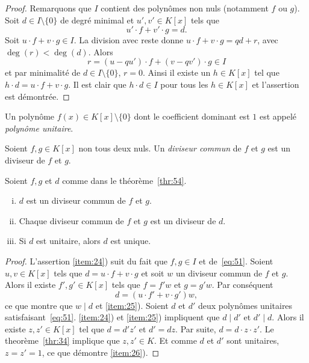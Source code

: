 \begin{proof}
  Remarquons que $I$ contient des polynômes non nuls (notamment $f$ ou $g$). Soit $d ∈ I \setminus \{0\}$ de degré minimal et $u',v' ∈ K[x]$ tels que
  \begin{displaymath}
    u' ⋅ f + v' ⋅g = d. 
  \end{displaymath}
  Soit $u⋅f + v⋅ g ∈ I$. La division avec reste donne $u⋅f + v⋅ g = qd +r$, avec $\deg(r) < \deg(d)$. Alors
  \begin{displaymath}
    r = (u - qu') ⋅ f + (v - qv') ⋅ g ∈ I
  \end{displaymath}
  et par minimalité de $d ∈ I \setminus\{0\}$, $r=0$. Ainsi il existe un $h∈K[x]$ tel que $h⋅d =  u⋅f + v⋅ g$. Il est clair que $h⋅d ∈I$ pour tous les $h ∈K[x]$ et l'assertion est démontrée.   
\end{proof}


\begin{definition}
  \label{def:54}
  Un polynôme $f(x) ∈ K[x] \setminus \{0\}$  dont le coefficient dominant est $1$ est appelé \emph{polynôme unitaire}. 
\end{definition}


\begin{definition}
  \label{def:55}
  Soient $f,g ∈ K[x]$ non tous deux nuls. Un \emph{diviseur commun} de $f$ et $g$  est un diviseur de $f$ et $g$. 
\end{definition}

\begin{theorem}
  \label{thr:55}
  Soient $f, g$ et $d$  comme dans le  théorème~\ref{thr:54}.
  \begin{enumerate}[i)]
  \item $d$ est un diviseur commun de $f$ et $g$. \label{item:24}
  \item Chaque diviseur commun de $f$ et $g$ est un diviseur de $d$. \label{item:25}
  \item Si $d$ est unitaire, alors $d$ est unique.  \label{item:26}
  \end{enumerate}
\end{theorem}

\begin{proof}
  L'assertion \ref{item:24}) suit du fait que $f,g ∈ I$ et de~\eqref{eq:51}. Soient $u,v ∈K[x]$  tels que
  $    d = u⋅f  + v ⋅ g $
  et soit $w$ un diviseur commun de $f$ et $g$. Alors il existe $f',g' ∈K[x]$ tels que  $f = f' w$ et $g = g' w$. Par conséquent
  \begin{displaymath}
    d = (u⋅f'  + v ⋅ g') w,
  \end{displaymath}
  ce que montre que $w \mid d$ et \ref{item:25}). 
  Soient $d$ et $d'$ deux polynômes unitaires satisfaisant~\eqref{eq:51}. \ref{item:24}) et \ref{item:25}) impliquent que $d \mid d'$ et $d' \mid d$.
  Alors il existe $z,z' ∈K[x]$ tel que $d = d' z'$ et $d' = dz$. Par suite, $d = d ⋅z ⋅ z'$. Le theorème~\ref{thr:34} implique que $z,z' ∈ K$. Et comme $d$ et $d'$ sont unitaires, $z=z'=1$, ce que démontre \ref{item:26}). 
\end{proof}

